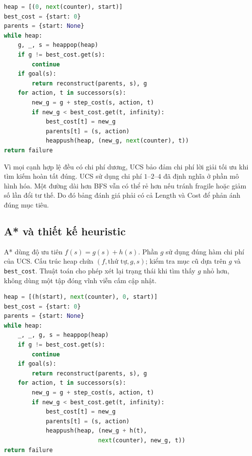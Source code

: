 \noindent\begin{minipage}{\linewidth}
\begin{lstlisting}[language=Python,caption={Mã giả UCS với cập nhật đường đi rẻ hơn}]
heap = [(0, next(counter), start)]
best_cost = {start: 0}
parents = {start: None}
while heap:
    g, _, s = heappop(heap)
    if g != best_cost.get(s):
        continue
    if goal(s):
        return reconstruct(parents, s), g
    for action, t in successors(s):
        new_g = g + step_cost(s, action, t)
        if new_g < best_cost.get(t, infinity):
            best_cost[t] = new_g
            parents[t] = (s, action)
            heappush(heap, (new_g, next(counter), t))
return failure
\end{lstlisting}
\end{minipage}
Vì mọi cạnh hợp lệ đều có chi phí dương, UCS bảo đảm chi phí lời giải tối ưu khi tìm kiếm hoàn tất đúng. UCS sử dụng chi phí $1$--$2$--$4$ đã định nghĩa ở phần mô hình hóa. Một đường dài hơn BFS vẫn có thể rẻ hơn nếu tránh fragile hoặc giảm số lần đổi tư thế. Do đó bảng đánh giá phải có cả Length và Cost để phản ánh đúng mục tiêu.

\subsection{A* và thiết kế heuristic}
A* dùng độ ưu tiên $f(s)=g(s)+h(s)$. Phần $g$ sử dụng đúng hàm chi phí của UCS. Cấu trúc heap chứa $(f,\text{thứ tự},g,s)$; kiểm tra mục cũ dựa trên $g$ và \texttt{best\_cost}. Thuật toán cho phép xét lại trạng thái khi tìm thấy $g$ nhỏ hơn, không dùng một tập đóng vĩnh viễn cấm cập nhật.

\noindent\begin{minipage}{\linewidth}
\begin{lstlisting}[language=Python,caption={Mã giả A* với hàm chi phí dùng cùng quy tắc UCS}]
heap = [(h(start), next(counter), 0, start)]
best_cost = {start: 0}
parents = {start: None}
while heap:
    _, _, g, s = heappop(heap)
    if g != best_cost.get(s):
        continue
    if goal(s):
        return reconstruct(parents, s), g
    for action, t in successors(s):
        new_g = g + step_cost(s, action, t)
        if new_g < best_cost.get(t, infinity):
            best_cost[t] = new_g
            parents[t] = (s, action)
            heappush(heap, (new_g + h(t),
                           next(counter), new_g, t))
return failure
\end{lstlisting}
\end{minipage}

